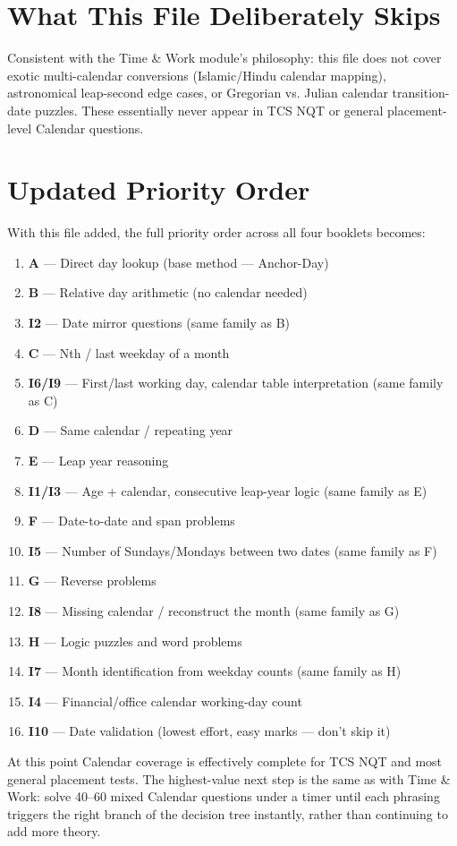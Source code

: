 \documentclass[11pt]{article}
\begin{document}
\section*{What This File Deliberately Skips}

Consistent with the Time \& Work module's philosophy: this file does not cover exotic multi-calendar
conversions (Islamic/Hindu calendar mapping), astronomical leap-second edge cases, or Gregorian vs.
Julian calendar transition-date puzzles. These essentially never appear in TCS NQT or general
placement-level Calendar questions.

\section*{Updated Priority Order}

With this file added, the full priority order across all four booklets becomes:

\begin{enumerate}[leftmargin=1.4em]
  \item \textbf{A} --- Direct day lookup (base method --- Anchor-Day)
  \item \textbf{B} --- Relative day arithmetic (no calendar needed)
  \item \textbf{I2} --- Date mirror questions (same family as B)
  \item \textbf{C} --- Nth / last weekday of a month
  \item \textbf{I6/I9} --- First/last working day, calendar table interpretation (same family as C)
  \item \textbf{D} --- Same calendar / repeating year
  \item \textbf{E} --- Leap year reasoning
  \item \textbf{I1/I3} --- Age + calendar, consecutive leap-year logic (same family as E)
  \item \textbf{F} --- Date-to-date and span problems
  \item \textbf{I5} --- Number of Sundays/Mondays between two dates (same family as F)
  \item \textbf{G} --- Reverse problems
  \item \textbf{I8} --- Missing calendar / reconstruct the month (same family as G)
  \item \textbf{H} --- Logic puzzles and word problems
  \item \textbf{I7} --- Month identification from weekday counts (same family as H)
  \item \textbf{I4} --- Financial/office calendar working-day count
  \item \textbf{I10} --- Date validation (lowest effort, easy marks --- don't skip it)
\end{enumerate}

\noindent At this point Calendar coverage is effectively complete for TCS NQT and most general
placement tests. The highest-value next step is the same as with Time \& Work: solve 40--60 mixed
Calendar questions under a timer until each phrasing triggers the right branch of the decision tree
instantly, rather than continuing to add more theory.
\end{document}
